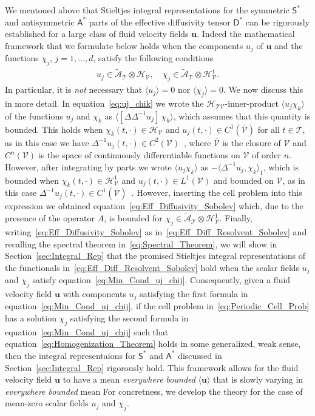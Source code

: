 \documentclass[leqno,onefignum,onetabnum]{siamltex1213}
\newcommand{\secref}[1]{Section~\ref{#1}}
\newcommand{\Tc}{\mathcal{T}}
\newcommand{\Vc}{\mathcal{V}}
\newcommand{\Dm}{\mathsf{D}}
\newcommand{\Sm}{\mathsf{S}}
\newcommand{\Am}{\mathsf{A}}
\newcommand{\Hs}{\mathscr{H}}
\newcommand{\As}{\mathscr{A}}
\newcommand{\vecu}{\boldsymbol{u}}
\begin{document}
We mentoned above that Stieltjes integral representations for the
symmetric $\Sm^*$ and antisymmetric $\Am^*$ parts of the effective
diffusivity tensor $\Dm^*$ can be rigorously established for a large
class of fluid velocity fields $\vecu$. Indeed the mathematical
framework that we formulate below holds when the components $u_j$ of
$\vecu$ and the functions $\chi_j$, $j=1,\ldots,d$, satisfy the following
conditions  
%
\begin{align} \label{eq:Min_Cond_uj_chij}
  u_j\in\tilde{\As}_{\Tc}\otimes\Hs_{\Vc}, \quad
  \chi_j\in\tilde{\As}_{\Tc}\otimes\Hs^1_{\Vc}. 
\end{align}
%
In particular, it is \emph{not} necessary that $\langle u_j\rangle=0$ nor
$\langle\chi_j\rangle=0$. We now discuss this in more detail. In
equation~\eqref{eq:uj_chik} we wrote the $\Hs_{\Tc\Vc}$-inner-product
$\langle u_j\chi_k\rangle$ of the functions $u_j$ and $\chi_k$ as $\langle[\Delta\Delta^{-1}u_j]\,\chi_k\rangle$,
which assumes that this quantity is bounded. This holds when
$\chi_k(t,\cdot)\in\Hs_{\Vc}$ and $u_j(t,\cdot)\in C^1(\overline{\Vc})$ for all
$t\in\Tc$, as in this case we have
$\Delta^{-1}u_j(t,\cdot)\in C^2(\Vc)$~\cite{McOwen:2003:PDE}, where
$\overline{\Vc}$ is the 
closure of $\Vc$ and $C^n(\Vc)$ is the space of continuously
differentiable functions on $\Vc$ of order $n$. However, after
integrating by parts we wrote $\langle u_j\chi_k\rangle$ as $-\langle\Delta^{-1}u_j,\chi_k\rangle_1$,
which is bounded when $\chi_k(t,\cdot)\in\Hs^1_{\Vc}$ and
$u_j(t,\cdot)\in L^1(\Vc)$ and bounded on $\Vc$, as in this case
$\Delta^{-1}u_j(t,\cdot)\in C^1(\overline{\Vc})$~\cite{McOwen:2003:PDE}. However,
inserting the cell problem into this expression we obtained
equation~\eqref{eq:Eff_Diffusivity_Sobolev} which, due to the presence
of the operator $A$, is bounded for
$\chi_j\in\tilde{\As}_{\Tc}\otimes\Hs^1_{\Vc}$. Finally,
writing~\eqref{eq:Eff_Diffusivity_Sobolev} as
in~\eqref{eq:Eff_Diff_Resolvent_Sobolev} and recalling the spectral
theorem in~\eqref{eq:Spectral_Theorem}, we will show in
\secref{sec:Integral_Rep} that the promised Stieltjes integral
representations of the functionals
in~\eqref{eq:Eff_Diff_Resolvent_Sobolev} hold when the scalar fields
$u_j$ and $\chi_j$ satisfy
equation~\eqref{eq:Min_Cond_uj_chij}. Consequently, given a fluid 
velocity field $\vecu$ with components $u_j$ satisfying the first
formula in equation~\eqref{eq:Min_Cond_uj_chij}, if the cell problem 
in~\eqref{eq:Periodic_Cell_Prob} has a solution $\chi_j$ satisfying the
second formula in equation~\eqref{eq:Min_Cond_uj_chij} such that 
equation~\eqref{eq:Homogenization_Theorem} holds in some generalized,
weak sense, then the integral representaions for  $\Sm^*$ and $\Am^*$
discussed in \secref{sec:Integral_Rep} rigorously hold. This framework
allows for the fluid velocity field $\vecu$ to have a mean
\emph{everywhere bounded} $\langle\vecu\rangle$ 
that is slowly varying in \emph{everywhere bounded} mean For
concretness, we develop the theory for the case of mean-zero scalar
fields $u_j$ and $\chi_j$.
\end{document}
